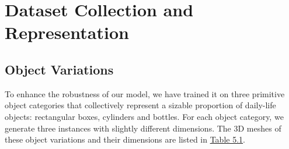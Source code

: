 \documentclass[11pt, a4paper]{report}
\theoremstyle{definition}
\begin{document}
\section{Dataset Collection and Representation}
\label{sec:5.2}


\subsection{Object Variations}
\label{sec:5.2.1}
To enhance the robustness of our model, we have trained it on three primitive object categories that collectively represent a sizable proportion of daily-life objects: rectangular boxes, cylinders and bottles. For each object category, we generate three instances with slightly different dimensions. The 3D meshes of these object variations and their dimensions are listed in \hyperref[tbl:5.1]{Table 5.1}.
\end{document}
